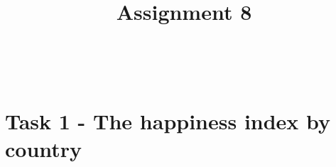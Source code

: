 \documentclass[a4paper]{article}
\date{}
\author{}
\title{\textbf{Assignment 8}}
\begin{document}
\maketitle 
\thispagestyle{fancy}


 \\

\section*{Task 1 - The happiness index by country}
\end{document}
